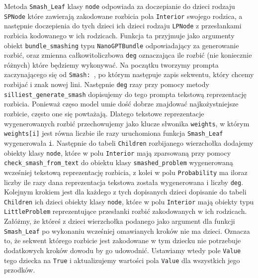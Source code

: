 \documentclass{article}
\begin{document}
Metoda \texttt{Smash\_Leaf} klasy \texttt{node} odpowiada za doczepianie do dzieci rodzaju \texttt{SPNode} które zawierają zakodowane rozbicia pola \texttt{Interior} swojego rodzica, a następnie doczepienia do tych dzieci ich dzieci
rodzaju \texttt{LPNode} z przesłankami rozbicia kodowanego w ich rodzicach. Funkcja ta przyjmuje jako argumenty obiekt \texttt{bundle\_smashing} typu \texttt{NanoGPTBundle} odpowiadający za generowanie rozbić, oraz zmienna całkowitoliczbowa \texttt{deg} oznaczająca ile rozbić (nie koniecznie różnych) które będziemy wykonywać. Na początku tworzymy prompta zaczynającego się od \texttt{Smash: }, po którym następuje zapis sekwentu, który chcemy rozbijać i znak nowej lini. Następnie \texttt{deg} rzay przy pomocy metody \texttt{silliest\_generate\_smash} dopisujemy do tego prompta tekstową reprezentację rozbicia. Ponieważ częso model umie dość dobrze znajdować najkożystniejsze rozbicie, często one się powtażają. Dlatego tekstowe reprezentacje wygenerowanych rozbić przechowujemy jako klucze słwonika \texttt{weights}, w którym \texttt{weights[i]} jest równa liczbie ile razy uruchomiona funkcja \texttt{Smash\_Leaf} 
wygenerowała \texttt{i}. Następnie do tabeli \texttt{Children} rozbijanego wierzchołka dodajemy obiekty klasy \texttt{node}, które w polu \texttt{Interior} mają zparsowaną przy pomocy \texttt{check\_smash\_from\_text} do obiektu klasy  \texttt{smashed\_problem} wygenerowaną wcześniej tekstową reprezentację rozbicia, z kolei w polu \texttt{Probability} ma iloraz liczby ile razy dana reprezentacja tekstowa została wygenerowana i liczby \texttt{deg}. Kolejnym krokiem jest dla każdego z tych dopisanych dzieci dopisanie do tabeli \texttt{Children} ich dzieci obiekty klasy \texttt{node}, które w polu \texttt{Interior} mają obiekty typu \texttt{LittleProblem} reprezentujące przesłanki rozbić zakodowanych w ich rodzicach. Załóżmy, że któreś z dzieci wierzchołka podanego jako argument dla funkcji \texttt{Smash\_Leaf} po wykonaniu wcześniej omawianych kroków nie ma dzieci. Oznacza to, że sekwent którego rozbicie jest zakodowane w tym dziecku nie potrzebuje dodatkowych kroków dowodu by go udowodnić. Ustawiamy wtedy pole \texttt{Value} tego dziecka na \texttt{True} i aktualizujemy wartości pola \texttt{Value} dla wszystkich jego przodków.
\end{document}
